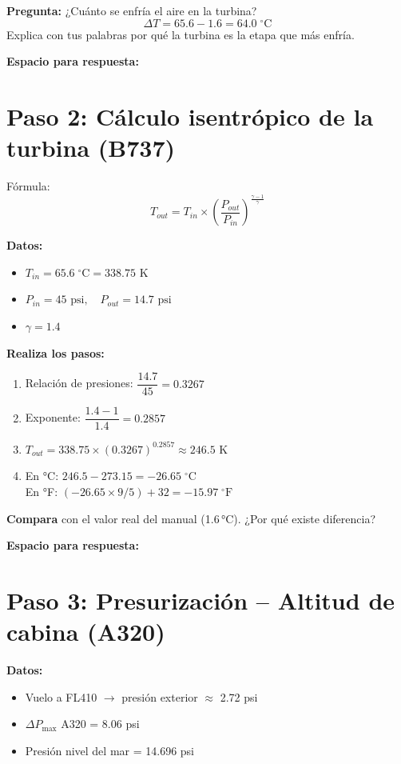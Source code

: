 \documentclass[11pt, a4paper]{article}
\begin{document}
\textbf{Pregunta:} ¿Cuánto se enfría el aire en la turbina? \\[2pt]
\[
\Delta T = 65.6 - 1.6 = \boxed{64.0 \;^{\circ}\text{C}}
\]
Explica con tus palabras por qué la turbina es la etapa que más enfría.

\vspace{0.3cm}
\textbf{Espacio para respuesta:}
\vspace{1cm}

\section{Paso 2: Cálculo isentrópico de la turbina (B737)}
Fórmula:
\[
T_{out} = T_{in} \times \left( \frac{P_{out}}{P_{in}} \right)^{\frac{\gamma-1}{\gamma}}
\]

\textbf{Datos:}
\begin{itemize}[noitemsep]
    \item \(T_{in} = 65.6 \;^{\circ}\text{C} = 338.75 \text{ K}\)
    \item \(P_{in} = 45 \text{ psi},\quad P_{out} = 14.7 \text{ psi}\)
    \item \(\gamma = 1.4\)
\end{itemize}

\textbf{Realiza los pasos:}
\begin{enumerate}
    \item Relación de presiones: \( \dfrac{14.7}{45} = \boxed{0.3267} \)
    \item Exponente: \( \dfrac{1.4 - 1}{1.4} = \boxed{0.2857} \)
    \item \( T_{out} = 338.75 \times (0.3267)^{0.2857} \approx \boxed{246.5 \text{ K}} \)
    \item En °C: \( 246.5 - 273.15 = \boxed{-26.65 \;^{\circ}\text{C}} \) \\
          En °F: \( (-26.65 \times 9/5) + 32 = \boxed{-15.97 \;^{\circ}\text{F}} \)
\end{enumerate}

\textbf{Compara} con el valor real del manual (1.6\,°C). ¿Por qué existe diferencia?

\vspace{0.3cm}
\textbf{Espacio para respuesta:}
\vspace{1.5cm}

\section{Paso 3: Presurización -- Altitud de cabina (A320)}
\textbf{Datos:}
\begin{itemize}[noitemsep]
    \item Vuelo a FL410 $\rightarrow$ presión exterior $\approx$ 2.72 psi
    \item \(\Delta P_{\max}\) A320 = 8.06 psi
    \item Presión nivel del mar = 14.696 psi
\end{itemize}
\end{document}
